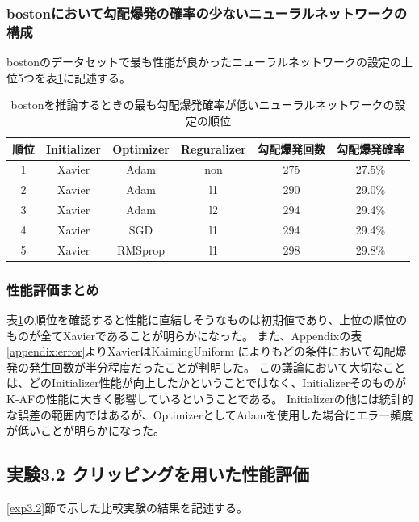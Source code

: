\subsubsection{bostonにおいて勾配爆発の確率の少ないニューラルネットワークの構成}
bostonのデータセットで最も性能が良かったニューラルネットワークの設定の上位5つを表\ref{bostonbest}に記述する。


\begin{table}[htbp]
    \begin{center}
        \caption{bostonを推論するときの最も勾配爆発確率が低いニューラルネットワークの設定の順位}
        \label{bostonbest}
        \vspace{2mm} 
        \begin{tabular}{ |c||c|c|c|c|c| }
        \hline
        順位 & Initializer & Optimizer &  Reguralizer & 勾配爆発回数 & 勾配爆発確率 \\
        \hline
        1 & Xavier & Adam & non & 275 & 27.5\%　\\
        \hline
        2 & Xavier & Adam & l1 & 290 & 29.0\%　\\
        \hline
        3 & Xavier & Adam & l2 & 294 & 29.4\%　\\
        \hline
        4 & Xavier & SGD & l1 & 294 & 29.4\%　\\
        \hline
        5 & Xavier & RMSprop & l1 & 298 & 29.8\%　\\
        \hline
        \end{tabular}
    \end{center}
\end{table}


\subsubsection{性能評価まとめ}
表\ref{bostonbest}の順位を確認すると性能に直結しそうなものは初期値であり、上位の順位のものが全てXavierであることが明らかになった。
また、Appendixの表\ref{appendix:error}よりXavierはKaimingUniform によりもどの条件において勾配爆発の発生回数が半分程度だったことが判明した。
この議論において大切なことは、どのInitializer性能が向上したかということではなく、InitializerそのものがK-AFの性能に大きく影響しているということである。
Initializerの他には統計的な誤差の範囲内ではあるが、OptimizerとしてAdamを使用した場合にエラー頻度が低いことが明らかになった。

\subsection{実験3.2 クリッピングを用いた性能評価}
\label{evo3.2}
\ref{exp3.2}節で示した比較実験の結果を記述する。



